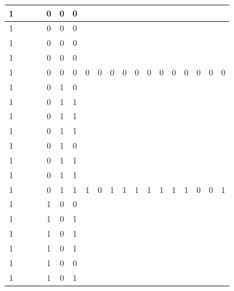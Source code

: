 \begin{table}[!tb]
\begin{tabular}{|c|c|c|c|c|c|c|c|c|c|c|c|c|c|c|c|c|c|c|}
        \rowcolor{yellow!40} 1 &  &  &  & 0 & 0 & 0 &  &  &  &  &  &  &  &  &  &  &  &  \\ \hline
        \rowcolor{yellow!40} 1 &  &  &  & 0 & 0 & 0 &  &  &  &  &  &  &  &  &  &  &  &  \\ \hline
        \rowcolor{yellow!40} 1 &  &  &  & 0 & 0 & 0 &  &  &  &  &  &  &  &  &  &  &  &  \\ \hline
        \rowcolor{yellow!40} 1 &  &  &  & 0 & 0 & 0 &  &  &  &  &  &  &  &  &  &  &  &  \\ \hline
        \rowcolor{yellow!40} 1 &  &  &  & 0 & 0 & 0 & 0 & 0 & 0 & 0 & 0 & 0 & 0 & 0 & 0 & 0 & 0 & 0 \\ \hline
        \rowcolor{gray!40} 1 &  &  &  & 0 & 1 & 0 &  &  &  &  &  &  &  &  &  &  &  &  \\ \hline
        \rowcolor{gray!40} 1 &  &  &  & 0 & 1 & 1 &  &  &  &  &  &  &  &  &  &  &  &  \\ \hline
        \rowcolor{gray!40} 1 &  &  &  & 0 & 1 & 1 &  &  &  &  &  &  &  &  &  &  &  &  \\ \hline
        \rowcolor{gray!40} 1 &  &  &  & 0 & 1 & 1 &  &  &  &  &  &  &  &  &  &  &  &  \\ \hline
        \rowcolor{gray!40} 1 &  &  &  & 0 & 1 & 0 &  &  &  &  &  &  &  &  &  &  &  &  \\ \hline
        \rowcolor{gray!40} 1 &  &  &  & 0 & 1 & 1 &  &  &  &  &  &  &  &  &  &  &  &  \\ \hline
        \rowcolor{gray!40} 1 &  &  &  & 0 & 1 & 1 &  &  &  &  &  &  &  &  &  &  &  &  \\ \hline
        \rowcolor{gray!40} 1 &  &  &  & 0 & 1 & 1 & 1 & 0 & 1 & 1 & 1 & 1 & 1 & 1 & 1 & 0 & 0 & 1 \\ \hline
        \rowcolor{blue!40} 1 &  &  &  & 1 & 0 & 0 &  &  &  &  &  &  &  &  &  &  &  &  \\ \hline
        \rowcolor{blue!40} 1 &  &  &  & 1 & 0 & 1 &  &  &  &  &  &  &  &  &  &  &  &  \\ \hline
        \rowcolor{blue!40} 1 &  &  &  & 1 & 0 & 1 &  &  &  &  &  &  &  &  &  &  &  &  \\ \hline
        \rowcolor{blue!40} 1 &  &  &  & 1 & 0 & 1 &  &  &  &  &  &  &  &  &  &  &  &  \\ \hline
        \rowcolor{blue!40} 1 &  &  &  & 1 & 0 & 0 &  &  &  &  &  &  &  &  &  &  &  &  \\ \hline
        \rowcolor{blue!40} 1 &  &  &  & 1 & 0 & 1 &  &  &  &  &  &  &  &  &  &  &  &  \\ \hline

\end{tabular}
\end{table}
